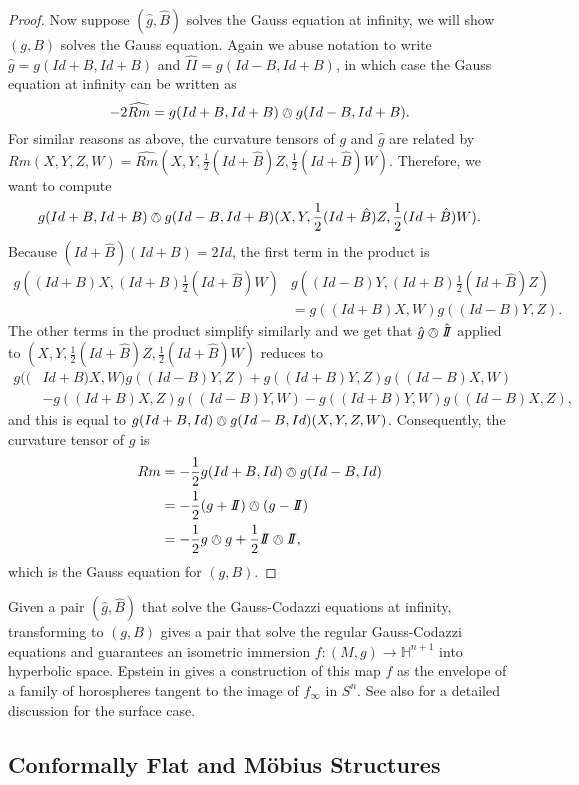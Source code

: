 \documentclass{amsart}
\newcommand{\two}{I\!\!I}
\renewcommand{\H}{\mathbb{H}}
\begin{document}
\begin{proof}
Now suppose $(\hat{g},\hat{B})$ solves the Gauss equation at infinity, we will show $(g,B)$ solves the Gauss equation.
Again we abuse notation to write $\hat{g} = g(Id + B, Id + B)$ and $\hat{\two} = g(Id - B, Id + B)$, in which case the Gauss equation at infinity can be written as
\[
-2\widehat{Rm} = g(Id+B,Id+B)\owedge g(Id-B,Id+B).
\]
For similar reasons as above, the curvature tensors of $g$ and $\hat{g}$ are related by $Rm(X,Y,Z,W) = \widehat{Rm}(X,Y,\frac{1}{2}(Id+\hat{B})Z,\frac{1}{2}(Id+\hat{B})W)$.
Therefore, we want to compute
\[
g(Id+B,Id+B)\owedge g(Id-B,Id+B)(X,Y,\frac{1}{2}(Id+\hat{B})Z,\frac{1}{2}(Id+\hat{B})W).
\]
Because $(Id+\hat{B})(Id+B) = 2Id$, the first term in the product is 
\begin{align*}
g((Id+B)X,(Id + B)\frac{1}{2}(Id+\hat{B})W)&g((Id-B)Y,(Id+B)\frac{1}{2}(Id+\hat{B})Z) \\
&= g((Id+B)X,W)g((Id-B)Y,Z).
\end{align*}
The other terms in the product simplify similarly and we get that $\hat{g}\owedge\hat{\two}$ applied to $(X,Y,\frac{1}{2}(Id+\hat{B})Z,\frac{1}{2}(Id+\hat{B})W)$ reduces to 
\begin{align*}
g((&Id+B)X,W)g((Id-B)Y,Z) + g((Id+B)Y,Z)g((Id-B)X,W) \\
&-g((Id+B)X,Z)g((Id-B)Y,W) - g((Id+B)Y,W)g((Id-B)X,Z),
\end{align*}
and this is equal to $g(Id+B,Id)\owedge g(Id-B,Id)(X,Y,Z,W)$.
Consequently, the curvature tensor of $g$ is
\begin{align*}
Rm &= -\frac{1}{2}g(Id+B,Id)\owedge g(Id-B,Id) \\
&= -\frac{1}{2}(g+\two)\owedge(g-\two) \\
&= -\frac{1}{2}g \owedge g + \frac{1}{2}\two \owedge \two,
\end{align*}
which is the Gauss equation for $(g,B)$.

\end{proof}

Given a pair $(\hat{g},\hat{B})$ that solve the Gauss-Codazzi equations at infinity, transforming to $(g,B)$ gives a pair that solve the regular Gauss-Codazzi equations and guarantees an isometric immersion $f: (M,g) \to \H^{n+1}$ into hyperbolic space. 
Epstein in \cite{Epstein1984} gives a construction of this map $f$ as the envelope of a family of horospheres tangent to the image of $f_\infty$ in $S^n$.
See also \cite{Anderson1998} for a detailed discussion for the surface case.

\subsection{Conformally Flat and M\"obius Structures}
\end{document}
